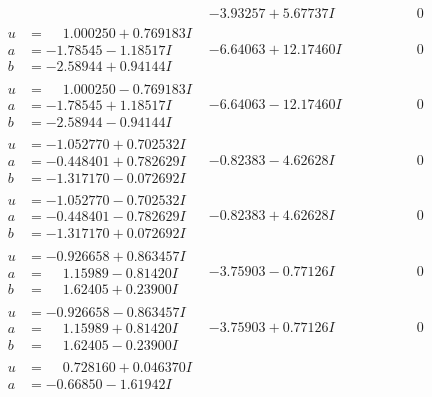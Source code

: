 \documentclass[1p]{elsarticle_modified}
\theoremstyle{definition}
\begin{document}
$$\begin{array}{c|c|c}
 & -3.93257 + 5.67737 I & \phantom{-0.000000 } 0 \\ \hline\begin{aligned}
u &= \phantom{-}1.000250 + 0.769183 I \\
a &= -1.78545 - 1.18517 I \\
b &= -2.58944 + 0.94144 I\end{aligned}
 & -6.64063 + 12.17460 I & \phantom{-0.000000 } 0 \\ \hline\begin{aligned}
u &= \phantom{-}1.000250 - 0.769183 I \\
a &= -1.78545 + 1.18517 I \\
b &= -2.58944 - 0.94144 I\end{aligned}
 & -6.64063 - 12.17460 I & \phantom{-0.000000 } 0 \\ \hline\begin{aligned}
u &= -1.052770 + 0.702532 I \\
a &= -0.448401 + 0.782629 I \\
b &= -1.317170 - 0.072692 I\end{aligned}
 & -0.82383 - 4.62628 I & \phantom{-0.000000 } 0 \\ \hline\begin{aligned}
u &= -1.052770 - 0.702532 I \\
a &= -0.448401 - 0.782629 I \\
b &= -1.317170 + 0.072692 I\end{aligned}
 & -0.82383 + 4.62628 I & \phantom{-0.000000 } 0 \\ \hline\begin{aligned}
u &= -0.926658 + 0.863457 I \\
a &= \phantom{-}1.15989 - 0.81420 I \\
b &= \phantom{-}1.62405 + 0.23900 I\end{aligned}
 & -3.75903 - 0.77126 I & \phantom{-0.000000 } 0 \\ \hline\begin{aligned}
u &= -0.926658 - 0.863457 I \\
a &= \phantom{-}1.15989 + 0.81420 I \\
b &= \phantom{-}1.62405 - 0.23900 I\end{aligned}
 & -3.75903 + 0.77126 I & \phantom{-0.000000 } 0 \\ \hline\begin{aligned}
u &= \phantom{-}0.728160 + 0.046370 I \\
a &= -0.66850 - 1.61942 I \\

\end{aligned}
\end{array}$$
\end{document}
